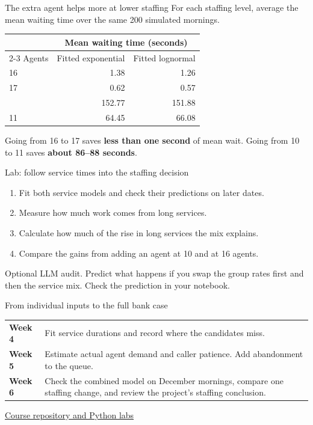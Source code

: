 \documentclass{beamer}
\begin{document}
\begin{frame}{The extra agent helps more at lower staffing}
  \small
  For each staffing level, average the mean waiting time over the same
  200 simulated mornings.

  \vspace{0.6em}
  \centering
  \begin{tabular}{@{}lrr@{}}
    \toprule
    & \multicolumn{2}{c}{Mean waiting time (seconds)}\\
    \cmidrule(l){2-3}
    Agents & Fitted exponential & Fitted lognormal\\
    \midrule
    16 &   1.38 &   1.26\\
    17 &   0.62 &   0.57\\
    \addlinespace
    10 & 152.77 & 151.88\\
    11 &  64.45 &  66.08\\
    \bottomrule
  \end{tabular}

  \vspace{0.65em}
  \raggedright
  Going from 16 to 17 saves \textbf{less than one second} of mean wait.
  Going from 10 to 11 saves \textbf{about 86--88 seconds}.
\end{frame}

\begin{frame}{Lab: follow service times into the staffing decision}
  \begin{enumerate}
    \item Fit both service models and check their predictions on later dates.
    \item Measure how much work comes from long services.
    \item Calculate how much of the rise in long services the mix explains.
    \item Compare the gains from adding an agent at 10 and at 16 agents.
  \end{enumerate}

  \vspace{0.45em}
  Optional LLM audit. Predict what happens if you swap the group rates
  first and then the service mix. Check the prediction in your notebook.
\end{frame}

\begin{frame}{From individual inputs to the full bank case}
  \small
  \begin{tabular}{@{}lp{8.5cm}@{}}
    \textbf{Week 4} & Fit service durations and record where the candidates miss.\\[0.5em]
    \textbf{Week 5} & Estimate actual agent demand and caller patience. Add abandonment to the queue.\\[0.5em]
    \textbf{Week 6} & Check the combined model on December mornings, compare one staffing change, and review the project's staffing conclusion.\\
  \end{tabular}

  \vspace{0.65em}
  \href{https://github.com/NaitsabesMue/stochastic-modeling-simulation-ds}{Course repository and Python labs}
\end{frame}
\end{document}
